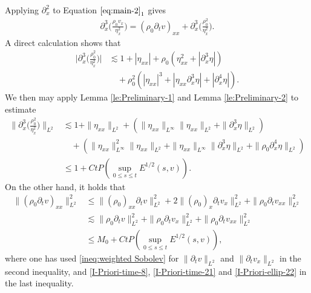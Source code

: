 \documentclass[11pt, reqno]{amsart}
\numberwithin{equation}{section}
\begin{document}
\bigskip
{} Applying \(\partial_x^2\) to Equation \(\eqref{eq:main-2}_1\) gives
\begin{equation}\label{I-Priori-ellip-23}
\begin{aligned}
\partial_x^3\bigg(\frac{\rho_0v_x}{\eta_x^2}\bigg)=(\rho_0\partial_tv)_{xx}
+\partial_x^3\bigg(\frac{\rho_0^2}{\eta_x^2}\bigg).
\end{aligned}
\end{equation}
A direct calculation shows that
\begin{equation*}
\begin{aligned}
\bigg|\partial_x^3\bigg({\frac{\rho_0^2}{\eta_x^2}}\bigg)\bigg|
&\lesssim 1+|\eta_{xx}|+\rho_0(\eta_{xx}^2+|\partial_x^3\eta|)\\
&\quad+\rho_0^2(|\eta_{xx}|^3+|\eta_{xx}\partial_x^3\eta|+|\partial_x^4\eta|).
\end{aligned}
\end{equation*}
We then may apply Lemma \ref{le:Preliminary-1} and Lemma \ref{le:Preliminary-2} to estimate
\begin{equation}\label{I-Priori-ellip-25}
\begin{aligned}
\bigg\|\partial_x^3\bigg({\frac{\rho_0^2}{\eta_x^2}}\bigg)\bigg\|_{L^2}
&\lesssim 1+\|\eta_{xx}\|_{L^2}+(\|\eta_{xx}\|_{L^\infty}\|\eta_{xx}\|_{L^2}+\|\partial_x^3\eta\|_{L^2})\\
&\quad+(\|\eta_{xx}\|_{L^\infty}^2\|\eta_{xx}\|_{L^2}
+\|\eta_{xx}\|_{L^\infty}\|\partial_x^3\eta\|_{L^2}
+\|\rho_0\partial_x^4\eta\|_{L^2})\\
&\leq 1+Ct P(\sup_{0\leq s\leq t}E^{1/2}(s,v)).
\end{aligned}
\end{equation}
On the other hand, it holds that
\begin{equation}\label{I-Priori-ellip-25.5}
\begin{aligned}
\|(\rho_0\partial_tv)_{xx}\|_{L^2}^2
&\leq \|(\rho_0)_{xx}\partial_tv\|_{L^2}^2+2\|(\rho_0)_x\partial_tv_{x}\|_{L^2}^2+\|\rho_0\partial_tv_{xx}\|_{L^2}^2\\
&\lesssim \|\rho_0\partial_tv\|_{L^2}^2+\|\rho_0\partial_tv_{x}\|_{L^2}^2+\|\rho_0\partial_tv_{xx}\|_{L^2}^2\\
&\leq M_0+Ct P(\sup_{0\leq s\leq t}E^{1/2}(s,v)),
\end{aligned}
\end{equation}
where one has used \eqref{ineq:weighted Sobolev} for \(\|\partial_tv\|_{L^2}\) and \(\|\partial_tv_{x}\|_{L^2}\) in the second inequality, and \eqref{I-Priori-time-8}, \eqref{I-Priori-time-21} and \eqref{I-Priori-ellip-22} in the last inequality.
\end{document}
